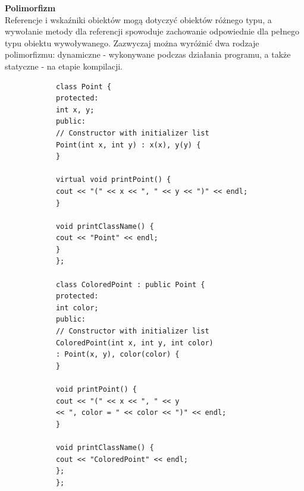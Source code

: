 \documentclass[12pt]{article}
\begin{document}
    \begin{definition}
        \textbf{Polimorfizm} \\
        Referencje i wskaźniki obiektów mogą dotyczyć obiektów różnego typu, a wywołanie metody dla referencji spowoduje zachowanie
        odpowiednie dla pełnego typu obiektu wywoływanego. Zazwyczaj można wyróżnić dwa rodzaje polimorfizmu: dynamiczne - wykonywane podczas działania programu,
        a także statyczne - na etapie kompilacji.
        \begin{verbatim}
            class Point {
            protected:
            int x, y;
            public:
            // Constructor with initializer list
            Point(int x, int y) : x(x), y(y) {
            }

            virtual void printPoint() {
            cout << "(" << x << ", " << y << ")" << endl;
            }

            void printClassName() {
            cout << "Point" << endl;
            }
            };

            class ColoredPoint : public Point {
            protected:
            int color;
            public:
            // Constructor with initializer list
            ColoredPoint(int x, int y, int color)
            : Point(x, y), color(color) {
            }

            void printPoint() {
            cout << "(" << x << ", " << y
            << ", color = " << color << ")" << endl;
            }

            void printClassName() {
            cout << "ColoredPoint" << endl;
            };
            };
        \end{verbatim}
    \end{definition}
\end{document}
